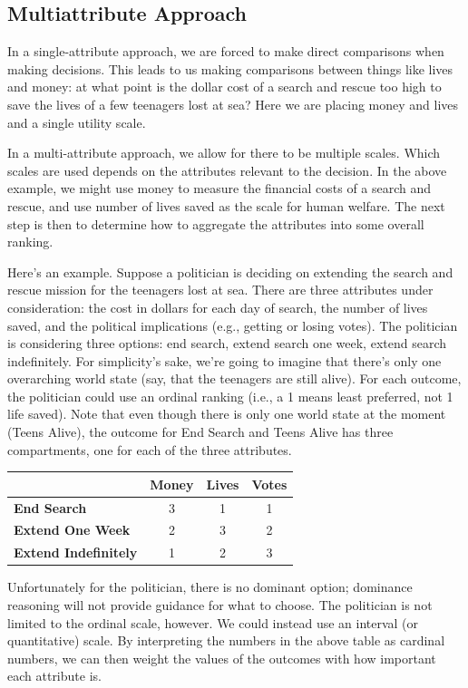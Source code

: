 \documentclass[]{tufte-book}
\begin{document}
\hypertarget{multiattribute-approach}{%
\subsection{Multiattribute Approach}\label{multiattribute-approach}}

In a single-attribute approach, we are forced to make direct comparisons when making decisions. This leads to us making comparisons between things like lives and money: at what point is the dollar cost of a search and rescue too high to save the lives of a few teenagers lost at sea? Here we are placing money and lives and a single utility scale.

In a multi-attribute approach, we allow for there to be multiple scales. Which scales are used depends on the attributes relevant to the decision. In the above example, we might use money to measure the financial costs of a search and rescue, and use number of lives saved as the scale for human welfare. The next step is then to determine how to aggregate the attributes into some overall ranking.

Here's an example. Suppose a politician is deciding on extending the search and rescue mission for the teenagers lost at sea. There are three attributes under consideration: the cost in dollars for each day of search, the number of lives saved, and the political implications (e.g., getting or losing votes). The politician is considering three options: end search, extend search one week, extend search indefinitely. For simplicity's sake, we're going to imagine that there's only one overarching world state (say, that the teenagers are still alive). For each outcome, the politician could use an ordinal ranking (i.e., a 1 means least preferred, not 1 life saved). Note that even though there is only one world state at the moment (Teens Alive), the outcome for End Search and Teens Alive has three compartments, one for each of the three attributes.

\begin{longtable}[]{@{}lccc@{}}
\toprule
& Money & Lives & Votes\tabularnewline
\midrule
\endhead
\textbf{End Search} & 3 & 1 & 1\tabularnewline
\textbf{Extend One Week} & 2 & 3 & 2\tabularnewline
\textbf{Extend Indefinitely} & 1 & 2 & 3\tabularnewline
\bottomrule
\end{longtable}

Unfortunately for the politician, there is no dominant option; dominance reasoning will not provide guidance for what to choose.
The politician is not limited to the ordinal scale, however. We could instead use an interval (or quantitative) scale. By interpreting the numbers in the above table as cardinal numbers, we can then weight the values of the outcomes with how important each attribute is.
\end{document}
